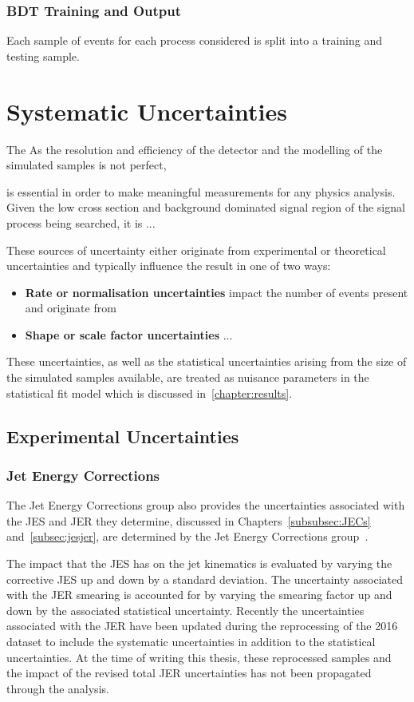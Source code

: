 
\subsection{BDT Training and Output}
Each sample of events for each process considered is split into a training and testing sample.
\chapter{Systematic Uncertainties}\label{chapter:systematics}
The 
As the resolution and efficiency of the detector and the modelling of the simulated samples is not perfect, 


 is essential in order to make meaningful measurements for any physics analysis.
Given the low cross section and background dominated signal region of the signal process being searched, it is ...

These sources of uncertainty either originate from experimental or theoretical uncertainties and typically influence the result in one of two ways:
\begin{itemize}
\item \textbf{Rate or normalisation uncertainties} impact the number of events present and originate from
\item \textbf{Shape or scale factor uncertainties} ...
\end{itemize}

These uncertainties, as well as the statistical uncertainties arising from the size of the simulated samples available, are treated as nuisance parameters in the statistical fit model which is discussed in~\ref{chapter:results}.

\section{Experimental Uncertainties}
\subsection{Jet Energy Corrections}
The Jet Energy Corrections group also provides the uncertainties associated with the JES and JER they determine, discussed in Chapters~\ref{subsubsec:JECs} and~\ref{subsec:jesjer}, are determined by the Jet Energy Corrections group~\cite{Khachatryan:2016kdb}. 

The impact that the JES has on the jet kinematics is evaluated by varying the corrective JES up and down by a standard deviation.
The uncertainty associated with the JER smearing is accounted for by varying the smearing factor up and down by the associated statistical uncertainty.
Recently the uncertainties associated with the JER have been updated during the reprocessing of the 2016 dataset to include the systematic uncertainties in addition to the statistical uncertainties.
At the time of writing this thesis, these reprocessed samples and the impact of the revised total JER uncertainties has not been propagated through the analysis.

